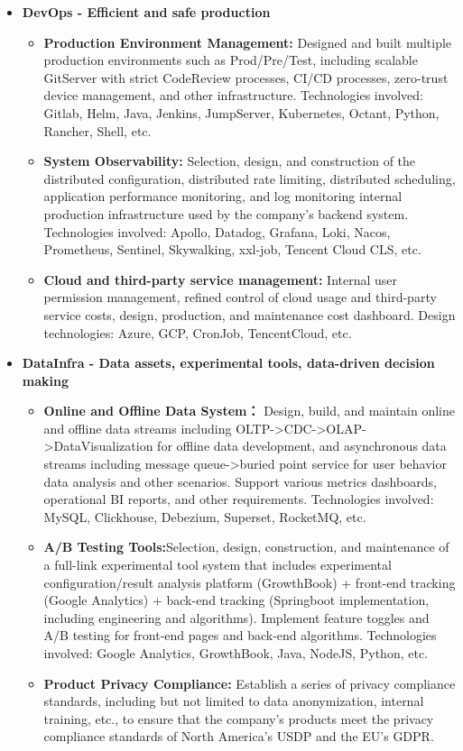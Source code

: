 \documentclass[letterpaper,11pt]{article}
\begin{document}
\begin{spacing}{0.9}
\begin{itemize}
\begin{itemize}
			\item \textbf{DevOps - Efficient and safe production}
			\begin{itemize}
				\item \textbf{Production Environment Management: }Designed and built multiple production environments such as Prod/Pre/Test, including scalable GitServer with strict CodeReview processes, CI/CD processes, zero-trust device management, and other infrastructure. Technologies involved: Gitlab, Helm, Java, Jenkins, JumpServer, Kubernetes, Octant, Python, Rancher, Shell, etc.
				\item \textbf{System Observability: }Selection, design, and construction of the distributed configuration, distributed rate limiting, distributed scheduling, application performance monitoring, and log monitoring internal production infrastructure used by the company's backend system. Technologies involved: Apollo, Datadog, Grafana, Loki, Nacos, Prometheus, Sentinel, Skywalking, xxl-job, Tencent Cloud CLS, etc.
				\item \textbf{Cloud and third-party service management: }Internal user permission management, refined control of cloud usage and third-party service costs, design, production, and maintenance cost dashboard. Design technologies: Azure, GCP, CronJob, TencentCloud, etc.
			\end{itemize}
			
			\item \textbf{DataInfra - Data assets, experimental tools, data-driven decision making}
			\begin{itemize}
				\item
				\textbf{Online and Offline Data System： }Design, build, and maintain online and offline data streams including OLTP->CDC->OLAP->DataVisualization for offline data development, and asynchronous data streams including message queue->buried point service for user behavior data analysis and other scenarios. Support various metrics dashboards, operational BI reports, and other requirements. Technologies involved: MySQL, Clickhouse, Debezium, Superset, RocketMQ, etc.
				\item
				\textbf{A/B Testing Tools:}Selection, design, construction, and maintenance of a full-link experimental tool system that includes experimental configuration/result analysis platform (GrowthBook) + front-end tracking (Google Analytics) + back-end tracking (Springboot implementation, including engineering and algorithms). Implement feature toggles and A/B testing for front-end pages and back-end algorithms. Technologies involved: Google Analytics, GrowthBook, Java, NodeJS, Python, etc.
				\item
				\textbf{Product Privacy Compliance: }Establish a series of privacy compliance standards, including but not limited to data anonymization, internal training, etc., to ensure that the company's products meet the privacy compliance standards of North America's USDP and the EU's GDPR.
			\end{itemize}
			

\end{itemize}
\end{itemize}
\end{spacing}
\end{document}
